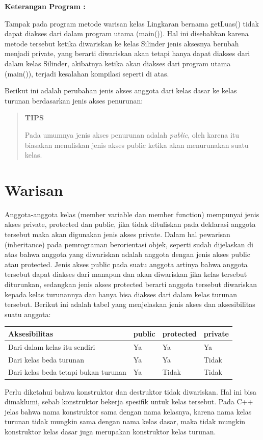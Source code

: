 \textbf{Keterangan Program :}

Tampak pada program metode warisan kelas Lingkaran bernama getLuas()
tidak dapat diakses dari dalam program utama (main()). Hal ini
disebabkan karena metode tersebut ketika diwariskan ke kelas Silinder
jenis aksesnya berubah menjadi private, yang berarti diwariskan akan
tetapi hanya dapat diakses dari dalam kelas Silinder, akibatnya ketika
akan diakses dari program utama (main()), terjadi kesalahan kompilasi
seperti di atas.

Berikut ini adalah perubahan jenis akses anggota dari kelas dasar ke
kelas turunan berdasarkan jenis akses penurunan:

\begin{quotation}
	\textbf{TIPS} 
	
	Pada
	umumnya jenis akses penurunan adalah \emph{public}, oleh karena itu
	biasakan menuliskan jenis akses public ketika akan menurunakan suatu
	kelas.
\end{quotation}
 

\section{Warisan}\label{warisan}

Anggota-anggota kelas (member variable dan member function) mempunyai
jenis akses private, protected dan public, jika tidak dituliskan pada
deklarasi anggota tersebut maka akan digunakan jenis akses private.
Dalam hal pewarisan (inheritance) pada pemrograman berorientasi objek,
seperti sudah dijelaskan di atas bahwa anggota yang diwariskan adalah
anggota dengan jenis akses public atau protected. Jenis akses public
pada suatu anggota artinya bahwa anggota tersebut dapat diakses dari
manapun dan akan diwariskan jika kelas tersebut diturunkan, sedangkan
jenis akses protected berarti anggota tersebut diwariskan kepada kelas
turunannya dan hanya bisa diakses dari dalam kelas turunan tersebut.
Berikut ini adalah tabel yang menjelaskan jenis akses dan aksesibilitas
suatu anggota:

\begin{longtable}[]{@{}llll@{}}
\toprule
Aksesibilitas & public & protected & private\tabularnewline
\midrule
\endhead
Dari dalam kelas itu sendiri & Ya & Ya & Ya\tabularnewline
Dari kelas beda turunan & Ya & Ya & Tidak\tabularnewline
Dari kelas beda tetapi bukan turunan & Ya & Tidak & Tidak\tabularnewline
\bottomrule
\end{longtable}

Perlu diketahui bahwa konstruktor dan destruktor tidak diwariskan. Hal
ini bisa dimaklumi, sebab konstruktor bekerja spesifik untuk kelas
tersebut. Pada C++ jelas bahwa nama konstruktor sama dengan nama
kelasnya, karena nama kelas turunan tidak mungkin sama dengan nama kelas
dasar, maka tidak mungkin konstruktor kelas dasar juga merupakan
konstruktor kelas turunan.


